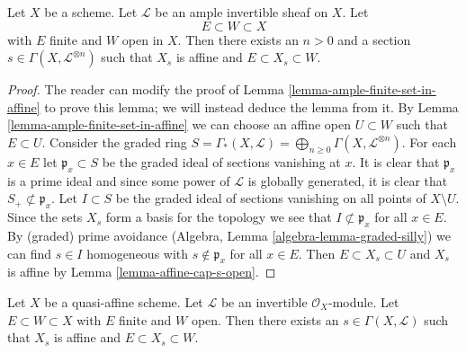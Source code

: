 \begin{lemma}
\label{lemma-ample-finite-set-in-principal-affine}
Let $X$ be a scheme. Let $\mathcal{L}$ be an ample invertible sheaf on $X$.
Let
$$
E \subset W \subset X
$$
with $E$ finite and $W$ open in $X$. Then there exists an $n > 0$
and a section $s \in \Gamma(X, \mathcal{L}^{\otimes n})$ such that
$X_s$ is affine and $E \subset X_s \subset W$.
\end{lemma}

\begin{proof}
The reader can modify the proof of Lemma \ref{lemma-ample-finite-set-in-affine}
to prove this lemma; we will instead deduce the lemma from it.
By Lemma \ref{lemma-ample-finite-set-in-affine} we can choose an affine
open $U \subset W$ such that $E \subset U$.
Consider the graded ring $S = \Gamma_*(X, \mathcal{L}) =
\bigoplus_{n \geq 0} \Gamma(X, \mathcal{L}^{\otimes n})$.
For each $x \in E$ let $\mathfrak p_x \subset S$ be the graded ideal
of sections vanishing at $x$. It is clear that $\mathfrak p_x$ is
a prime ideal and since some power of $\mathcal{L}$ is globally
generated, it is clear that $S_{+} \not \subset \mathfrak p_x$.
Let $I \subset S$ be the graded ideal of sections vanishing on all
points of $X \setminus U$. Since the sets $X_s$ form a basis
for the topology we see that $I \not \subset \mathfrak p_x$ for
all $x \in E$.
By (graded) prime avoidance (Algebra, Lemma \ref{algebra-lemma-graded-silly})
we can find $s \in I$ homogeneous
with $s \not \in \mathfrak p_x$ for all $x \in E$.
Then $E \subset X_s \subset U$ and $X_s$ is affine by
Lemma \ref{lemma-affine-cap-s-open}.
\end{proof}

\begin{lemma}
\label{lemma-quasi-affine-invertible-nonvanishing-section}
Let $X$ be a quasi-affine scheme. Let $\mathcal{L}$ be an invertible
$\mathcal{O}_X$-module. Let $E \subset W \subset X$ with $E$ finite
and $W$ open. Then there exists an $s \in \Gamma(X, \mathcal{L})$
such that $X_s$ is affine and $E \subset X_s \subset W$.
\end{lemma}

